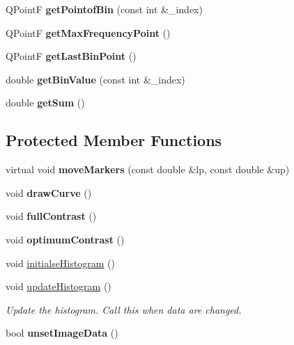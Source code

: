 \begin{DoxyCompactItemize}
\mbox{\label{classBarScreen_a3c553483ebb07bd496004d8300eb804f}} 
Q\+PointF {\bfseries get\+Pointof\+Bin} (const int \&\+\_\+index)
\item 
\mbox{\label{classBarScreen_acba5c2bfeac649e5ffdea5255a4537d8}} 
Q\+PointF {\bfseries get\+Max\+Frequency\+Point} ()
\item 
\mbox{\label{classBarScreen_a2a02e1300c43cebc6b61140e7aebc82c}} 
Q\+PointF {\bfseries get\+Last\+Bin\+Point} ()
\item 
\mbox{\label{classBarScreen_aad073d21512c112ca8892e1d7be7b21c}} 
double {\bfseries get\+Bin\+Value} (const int \&\+\_\+index)
\item 
\mbox{\label{classBarScreen_ab6abcfa2f17cd1abe87f33cd2de73683}} 
double {\bfseries get\+Sum} ()
\end{DoxyCompactItemize}
\subsection*{Protected Member Functions}
\begin{DoxyCompactItemize}
\item 
\mbox{\label{classBarScreenWL_ae9fc48d793992e407f97482633e45b6f}} 
virtual void {\bfseries move\+Markers} (const double \&lp, const double \&up)
\item 
\mbox{\label{classBarScreenWL_adce784a784ce08d5869c06b47c47f5cd}} 
void {\bfseries draw\+Curve} ()
\item 
\mbox{\label{classBarScreenWL_acfd77bb6baf8be662ddb887f012c007b}} 
void {\bfseries full\+Contrast} ()
\item 
\mbox{\label{classBarScreenWL_a5ba898b64823f473102e06a262aaf3e2}} 
void {\bfseries optimum\+Contrast} ()
\item 
void \mbox{\hyperlink{classBarScreen_ae652343345f7cc3f7726569c1195ee9a}{initialse\+Histogram}} ()
\item 
\mbox{\label{classBarScreen_a3e9d73bcf97e00634bf7c8b78d2cbad0}} 
void \mbox{\hyperlink{classBarScreen_a3e9d73bcf97e00634bf7c8b78d2cbad0}{update\+Histogram}} ()
\begin{DoxyCompactList}\small\item\em Update the histogram. Call this when data are changed. \end{DoxyCompactList}\item 
\mbox{\label{classBarScreen_a4d2a43c01c702ce90ffd4433a07d2b73}} 
bool {\bfseries unset\+Image\+Data} ()
\end{DoxyCompactItemize}
